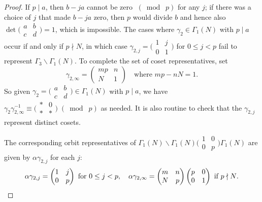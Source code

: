 \documentclass[10pt,leqno,twoside]{article}
\theoremstyle{plain}
\theoremstyle{definition}
\numberwithin{equation}{section}
\numberwithin{lem}{section}
\newcommand{\smod}[1]{\;(\bmod\; #1)}
\newcommand{\smallabcd}{\big(\!\begin{smallmatrix}
    a & b \\ c & d
\end{smallmatrix}\!\big)}
\begin{document}
\begin{proof}
    If $p\mid a$, then $b-ja$ cannot be zero $\smod p$ for any $j$; if there was a choice of $j$ that made $b-ja$ zero, then $p$ would divide $b$ and hence also $\det \smallabcd = 1$, which is impossible. The cases where $\gamma_2\in\varGamma_1(N)$ with $p\mid a$ occur if and only if $p\nmid N$, in which case $\gamma_{2,j} = \big(\!\begin{smallmatrix}
        1& j \\ 0 & 1
    \end{smallmatrix}\!\big)$ for $0\leq j < p$ fail to represent $\varGamma_3\backslash\varGamma_1(N)$. To complete the set of coset representatives, set 
    \[\gamma_{2,\infty} = \begin{pmatrix}
        mp & n \\ N & 1
    \end{pmatrix}\quad \text{where $mp-nN = 1$}.\]
    So given $\gamma_2 = \smallabcd\in\varGamma_1(N)$ with $p\mid a$, we have $\gamma_2\gamma_{2,\infty}^{-1}\equiv \big(\!\begin{smallmatrix}
        \ast & 0 \\ \ast & \ast
    \end{smallmatrix}\!\big) \smod p$ as needed. It is also routine to check that the $\gamma_{2,j}$ represent distinct cosets.

    The corresponding orbit representatives of $\varGamma_1(N)\backslash \varGamma_1(N)\big(\!\begin{smallmatrix}
        1 & 0 \\ 0 & p
    \end{smallmatrix}\!\big)\varGamma_1(N)$ are given by $\alpha\gamma_{2,j}$ for each $j$: \[\alpha\gamma_{2,j} = \begin{pmatrix}
        1 & j \\ 0 & p
    \end{pmatrix}\text{ for $0\leq j < p$},\quad \alpha\gamma_{2,\infty} = \begin{pmatrix}
        m & n \\ N & p
    \end{pmatrix}\begin{pmatrix}
        p & 0 \\ 0 & 1
    \end{pmatrix}\text{ if $p\nmid N$}.\qedhere\]
\end{proof}
\end{document}
